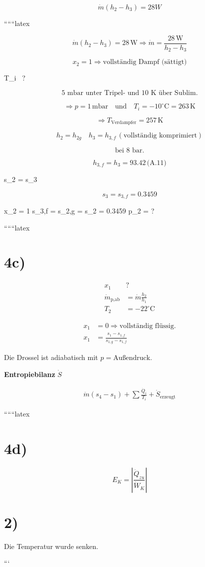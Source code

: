 \[
\dot{m}(h_2 - h_3) = 28W
\]

``````latex


\[
\dot{m} (h_2 - h_3) = 28 \, \text{W} \Rightarrow \dot{m} = \frac{28 \, \text{W}}{h_2 - h_3}
\]

\[
x_2 = 1 \Rightarrow \text{vollständig Dampf (sättigt)}
\]

 T_i \, ?

\[
\text{5 mbar unter Tripel- und 10 K über Sublim.}
\]

\[
\Rightarrow p = 1 \, \text{mbar} \quad \text{und} \quad T_i = -10^\circ \text{C} = 263 \, \text{K}
\]

\[
\Rightarrow T_{\text{Verdampfer}} = 257 \, \text{K}
\]

\[
h_2 = h_{2g} \quad h_3 = h_{3,f} \, (\text{vollständig komprimiert})
\]

\[
\text{bei 8 bar.}
\]

\[
h_{3,f} = h_3 = 93.42 \, \text{(A.11)}
\]

 \Rightarrow s_2 = s_3

\[
s_3 = s_{3,f} = 0.3459
\]

 \quad x_2 = 1 \Rightarrow s_{3,f} = s_{2,g} = s_2 = 0.3459 \Rightarrow p_2 = ?
\]

``````latex


\section*{4c)}

\begin{align*}
x_1 & \text{?} \\
\dot{m}_{\text{p,ab}} & = \dot{m} \frac{h_2}{h_1} \\
T_2 & = -22^\circ \text{C}
\end{align*}

\begin{align*}
x_1 & = 0 \Rightarrow \text{vollständig flüssig.} \\
x_1 & = \frac{s_1 - s_{1,f}}{s_{1,g} - s_{1,f}}
\end{align*}

Die Drossel ist adiabatisch mit \( p = \text{Außendruck} \).

\textbf{Entropiebilanz} \( \dot{S} \)

\begin{align*}
\dot{m} (s_4 - s_1) + \sum \frac{\dot{Q}_i}{T_i} + \dot{S}_{\text{erzeugt}}
\end{align*}

``````latex


\section*{4d)}
\begin{equation*}
E_K = \left| \frac{\dot{Q}_{zu}}{\dot{W}_K} \right|
\end{equation*}

\section*{2)}
Die Temperatur wurde senken.

```